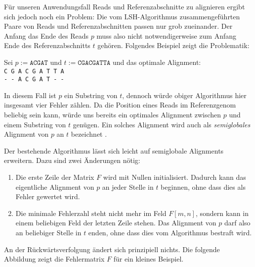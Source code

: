 Für unseren Anwendungsfall Reads und Referenzabschnitte zu alignieren ergibt sich jedoch noch ein Problem: Die vom LSH-Algorithmus zusammengeführten Paare von Reads und Referenzabschnitten passen nur grob zueinander. Der Anfang \bzw das Ende des Reads $p$ muss also nicht notwendigerweise zum Anfang \bzw Ende des Referenzabschnitts $t$ gehören. Folgendes Beispiel zeigt die Problematik:

\begin{beispiel}
\label{bsp:align:basics:optalign}
Sei $p := \texttt{ACGAT}$ und $t := \texttt{CGACGATTA}$ und das optimale Alignment: \\
\texttt{C G A C G A T T A}\\
\texttt{- - A C G A T - -}
\end{beispiel}

In diesem Fall ist $p$ ein Substring von $t$, dennoch würde obiger Algorithmus hier insgesamt vier Fehler zählen. Da die Position eines Reads im Referenzgenom beliebig sein kann, würde uns bereits ein optimales Alignment zwischen $p$ und einem Substring von $t$ genügen. Ein solches Alignment wird auch als \textit{semiglobales} Alignment von $p$ an $t$ bezeichnet \citep{Rahmann2013, Ukkonen1985}.

Der bestehende Algorithmus lässt sich leicht auf semiglobale Alignments erweitern. Dazu sind zwei Änderungen nötig:

\begin{enumerate}
\item Die erste Zeile der Matrix $F$ wird mit Nullen initialisiert. Dadurch kann das eigentliche Alignment von $p$ an jeder Stelle in $t$ beginnen, ohne dass dies als Fehler gewertet wird.
\item Die minimale Fehlerzahl steht nicht mehr im Feld $F[m,n]$, sondern kann in einem beliebigen Feld der letzten Zeile stehen. Das Alignment von $p$ darf also an beliebiger Stelle in $t$ enden, ohne dass dies vom Algorithmus bestraft wird.
\end{enumerate}

An der Rückwärtsverfolgung ändert sich prinzipiell nichts. Die folgende Abbildung zeigt die Fehlermatrix $F$ für ein kleines Beispiel.

